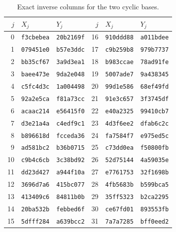 \begin{table}[H]
\centering\small
\begin{tabular}{rll@{\qquad}rll}
\toprule
$j$ & $X_j$ & $Y_j$ & $j$ & $X_j$ & $Y_j$ \\
\midrule
0 & \texttt{f3cbebea} & \texttt{20b2169f} & 16 & \texttt{910ddd88} & \texttt{a011bdee} \\
1 & \texttt{079451e0} & \texttt{b57e3ddc} & 17 & \texttt{c9b259b8} & \texttt{979b7737} \\
2 & \texttt{bb35cf67} & \texttt{3a9d3ea1} & 18 & \texttt{b983ccae} & \texttt{78ad91fe} \\
3 & \texttt{baee473e} & \texttt{9da2e048} & 19 & \texttt{5007ade7} & \texttt{9a438345} \\
4 & \texttt{c5fc4d3c} & \texttt{1a004498} & 20 & \texttt{99d1e586} & \texttt{68ef49fd} \\
5 & \texttt{92a2e5ca} & \texttt{f81a73cc} & 21 & \texttt{91e3c657} & \texttt{3f3745df} \\
6 & \texttt{acaac214} & \texttt{e56415f0} & 22 & \texttt{e40a2325} & \texttt{99410cb7} \\
7 & \texttt{d3e21a4a} & \texttt{c4edf9c1} & 23 & \texttt{4d3f6ee2} & \texttt{dfab6c2c} \\
8 & \texttt{b896618d} & \texttt{fcceda36} & 24 & \texttt{fa7584f7} & \texttt{e975ed5c} \\
9 & \texttt{ad581bc2} & \texttt{b36b0715} & 25 & \texttt{c73dd0ea} & \texttt{f50800fb} \\
10 & \texttt{c9b4c6cb} & \texttt{3c38bd92} & 26 & \texttt{52d75144} & \texttt{4a59035e} \\
11 & \texttt{dd23d427} & \texttt{a944f10a} & 27 & \texttt{e7761753} & \texttt{32f1698b} \\
12 & \texttt{3696d7a6} & \texttt{415bc077} & 28 & \texttt{4fb5683b} & \texttt{b599bca5} \\
13 & \texttt{413409c6} & \texttt{84811b0b} & 29 & \texttt{35ff5323} & \texttt{b2ca2295} \\
14 & \texttt{20ba532b} & \texttt{febbed6f} & 30 & \texttt{ce67fd01} & \texttt{893553fb} \\
15 & \texttt{5dfff284} & \texttt{a639bcc2} & 31 & \texttt{7a7a7285} & \texttt{bff0eed2} \\
\bottomrule
\end{tabular}
\caption{Exact inverse columns for the two cyclic bases.}
\label{tab:inverse}
\end{table}
